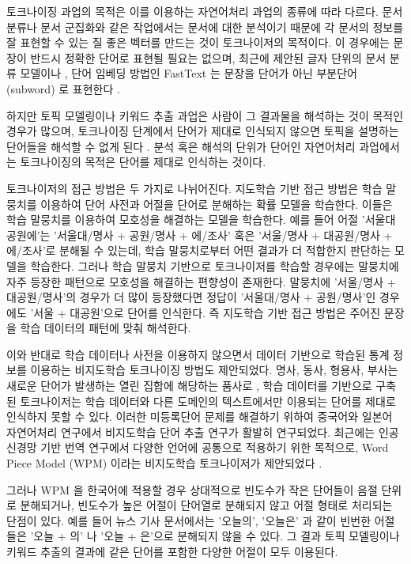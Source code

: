 \documentclass[oneside, ko,phd]{snuthesis_utf8_kor}
\begin{document}
토크나이징 과업의 목적은 이를 이용하는 자연어처리 과업의 종류에 따라 다르다.
문서 분류나 문서 군집화와 같은 작업에서는 문서에 대한 분석이기 때문에 각 문서의 정보를 잘 표현할 수 있는 질 좋은 벡터를 만드는 것이 토크나이저의 목적이다.
이 경우에는 문장이 반드시 정확한 단어로 표현될 필요는 없으며, 최근에 제안된 글자 단위의 문서 분류 모델이나 \cite{zhang2015character}, 단어 임베딩 방법인 FastText 는 문장을 단어가 아닌 부분단어 (subword) 로 표현한다 \cite{bojanowski2016enriching, joulin2016bag}.

하지만 토픽 모델링이나 키워드 추출 과업은 사람이 그 결과물을 해석하는 것이 목적인 경우가 많으며, 토크나이징 단계에서 단어가 제대로 인식되지 않으면 토픽을 설명하는 단어들을 해석할 수 없게 된다 \cite{hall2008studying}.
분석 혹은 해석의 단위가 단어인 자연어처리 과업에서는 토크나이징의 목적은 단어를 제대로 인식하는 것이다.

토크나이저의 접근 방법은 두 가지로 나뉘어진다.
지도학습 기반 접근 방법은 학습 말뭉치를 이용하여 단어 사전과 어절을 단어로 분해하는 확률 모델을 학습한다.
이들은 학습 말뭉치를 이용하여 모호성을 해결하는 모델을 학습한다.
예를 들어 어절 '서울대공원에'는 '서울대/명사 + 공원/명사 + 에/조사' 혹은 '서울/명사 + 대공원/명사 + 에/조사'로 분해될 수 있는데, 학습 말뭉치로부터 어떤 결과가 더 적합한지 판단하는 모델을 학습한다.
그러나 학습 말뭉치 기반으로 토크나이저를 학습할 경우에는 말뭉치에 자주 등장한 패턴으로 모호성을 해결하는 편향성이 존재한다.
말뭉치에 '서울/명사 + 대공원/명사'의 경우가 더 많이 등장했다면 정답이 '서울대/명사 + 공원/명사'인 경우에도 '서울 + 대공원'으로 단어를 인식한다.
즉 지도학습 기반 접근 방법은 주어진 문장을 학습 데이터의 패턴에 맞춰 해석한다.

이와 반대로 학습 데이터나 사전을 이용하지 않으면서 데이터 기반으로 학습된 통계 정보를 이용하는 비지도학습 토크나이징 방법도 제안되었다.
명사, 동사, 형용사, 부사는 새로운 단어가 발생하는 열린 집합에 해당하는 품사로 \cite{jurafsky2000speech}, 학습 데이터를 기반으로 구축된 토크나이저는 학습 데이터와 다른 도메인의 텍스트에서만 이용되는 단어를 제대로 인식하지 못할 수 있다.
이러한 미등록단어 문제를 해결하기 위하여 중국어와 일본어 자연어처리 연구에서 비지도학습 단어 추출 연구가 활발히 연구되었다.
최근에는 인공 신경망 기반 번역 연구에서 다양한 언어에 공통으로 적용하기 위한 목적으로, Word Piece Model (WPM) 이라는 비지도학습 토크나이저가 제안되었다 \cite{sennrich2015neural}.

그러나 WPM 을 한국어에 적용할 경우 상대적으로 빈도수가 작은 단어들이 음절 단위로 분해되거나, 빈도수가 높은 어절이 단어열로 분해되지 않고 어절 형태로 처리되는 단점이 있다.
예를 들어 뉴스 기사 문서에서는 '오늘의', '오늘은' 과 같이 빈번한 어절들은 '오늘 + 의' 나 '오늘 + 은'으로 분해되지 않을 수 있다.
그 결과 토픽 모델링이나 키워드 추출의 결과에 같은 단어를 포함한 다양한 어절이 모두 이용된다.
\end{document}
